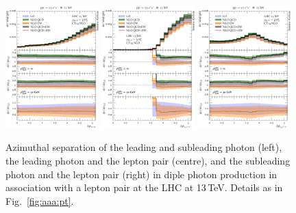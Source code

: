 \begin{figure}[t!]
  \centering
  \includegraphics[width=0.32\textwidth]{figs_aaz/dphi_y1_y2}
  \includegraphics[width=0.32\textwidth]{figs_aaz/dphi_y1_l1l2}
  \includegraphics[width=0.32\textwidth]{figs_aaz/dphi_y2_l1l2}
  \caption{
    Azimuthal separation of the leading and subleading photon (left),
    the leading photon and the lepton pair (centre), and the subleading 
    photon and the lepton pair (right)
    in diple photon production in association with a lepton pair 
    at the LHC at 13\,TeV. 
    Details as in Fig.\ \ref{fig:aaa:pt}.
    \label{fig:aaz:dphi}
  }
\end{figure}

